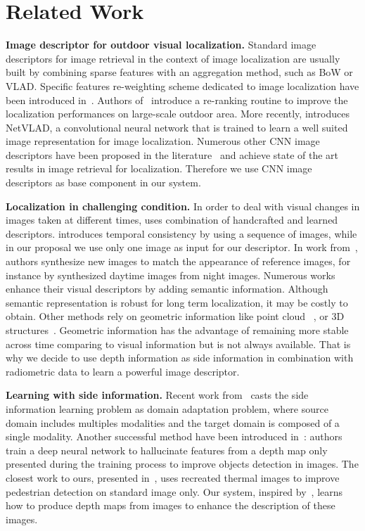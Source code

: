 \section{Related Work}
\label{sec:related_work}

\vspace{4pt}\noindent\textbf{Image descriptor for outdoor visual localization.} Standard image descriptors for image retrieval in the context of image localization are usually built by combining sparse features with an aggregation method, such as BoW or VLAD. Specific features re-weighting scheme dedicated to image localization have been introduced in~\cite{Arandjelovic2014}. Authors of~\cite{Sattler2016} introduce a re-ranking routine to improve the localization performances on large-scale outdoor area. More recently, \cite{Arandjelovic2017} introduces NetVLAD, a convolutional neural network that is trained to learn a well suited image representation for image localization. Numerous other CNN image descriptors have been proposed in the literature~\cite{Kim2017a,Gordo2017,Radenovic2017,Sunderhauf2015a,Liu2018} and achieve state of the art results in image retrieval for localization. Therefore we use CNN image descriptors as base component in our system.

\vspace{4pt}\noindent\textbf{Localization in challenging condition.} In order to deal with visual changes in images taken at different times, \cite{Naseer2018} uses combination of handcrafted and learned descriptors. \cite{Garg2018} introduces temporal consistency by using a sequence of images, while in our proposal we use only one image as input for our descriptor. In work from~\cite{Porav2018}, authors synthesize new images to match the appearance of reference images, for instance by synthesized daytime images from night images. Numerous works~\cite{Stenborg2018,Toft2018,Naseer2017a} enhance their visual descriptors by adding semantic information. Although semantic representation is robust for long term localization, it may be costly to obtain. Other methods rely on geometric information like point cloud~\cite{Sattler2018,Schonberger2018} , or 3D structures~\cite{Torii2015}. Geometric information has the advantage of remaining more stable across time comparing to visual information but is not always available. That is why we decide to use depth information as side information in combination with radiometric data to learn a powerful image descriptor.

\vspace{4pt}\noindent\textbf{Learning with side information.} Recent work from~\cite{Li2017b} casts the side information learning problem as domain adaptation problem, where source domain includes multiples modalities and the target domain is composed of a single modality. Another successful method have been introduced in~\cite{Hoffman2016}: authors train a deep neural network to hallucinate features from a depth map only presented during the training process to improve objects detection in images. The closest work to ours, presented in~\cite{xu2017learning}, uses recreated thermal images to improve pedestrian detection on standard image only. Our system, inspired by~\cite{xu2017learning}, learns how to produce depth maps from images to enhance the description of these images.
